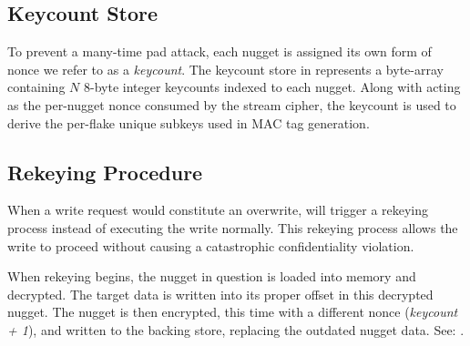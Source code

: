 
\subsection{Keycount Store}

To prevent a many-time pad attack, each nugget is assigned its own
form of nonce we refer to as a \emph{keycount}. The keycount store in
 represents a byte-array containing $N$ 8-byte
integer keycounts indexed to each nugget.  Along with acting as the
per-nugget nonce consumed by the stream cipher, the keycount is used
to derive the per-flake unique subkeys used in MAC tag generation.

\subsection{Rekeying Procedure}

When a write request would constitute an overwrite, \SYSTEM{} will
trigger a rekeying process instead of executing the write normally.
This rekeying process allows the write to proceed without causing a
catastrophic confidentiality violation.

When rekeying begins, the nugget in question is loaded into memory and
decrypted. The target data is written into its proper offset in this decrypted
nugget. The nugget is then encrypted, this time with a different nonce
(\textit{keycount + 1}), and written to the backing store, replacing the
outdated nugget data. See: .

